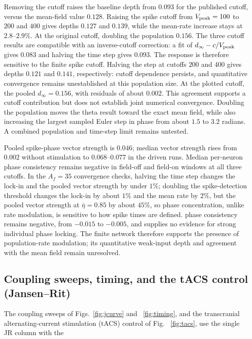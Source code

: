 \documentclass[11pt,a4paper]{article}
\providecommand{\DIFaddtex}[1]{{\protect\color{blue} \sf #1}} %
\providecommand{\DIFdeltex}[1]{{\protect\color{red} \scriptsize #1}} %
\providecommand{\DIFaddbegin}{} %
\providecommand{\DIFaddend}{} %
\providecommand{\DIFdelbegin}{} %
\providecommand{\DIFdelend}{} %
\providecommand{\DIFadd}[1]{\texorpdfstring{\DIFaddtex{#1}}{#1}} %
\providecommand{\DIFdel}[1]{\texorpdfstring{\DIFdeltex{#1}}{}} %
\begin{document}
\DIFadd{Removing the cutoff raises the baseline depth from }\DIFaddend $0.093$ \DIFdelbegin \DIFdel{for the published cutoff,
versus the mean-field value $0.128$. Raising the spike cutoff from $V_{\rm peak}=100$ }\DIFdelend to \DIFdelbegin \DIFdel{$200$ and $400$ gives depths $0.127$ and $0.139$, while the mean-rate increase
stays at $2.8$--$2.9\%$.
At the original cutoff, doubling the population}\DIFdelend \DIFaddbegin \DIFadd{$0.156$.
The three cutoff results are compatible with an inverse-cutoff correction:
a fit of $d_\infty-c/V_{\rm peak}$ }\DIFaddend gives \DIFdelbegin \DIFdel{$0.083$ and halving the time step gives $0.093$. The response is therefore
sensitive to the finite spike cutoff. Halving the step at cutoffs $200$ and
$400$ gives depths $0.121$ and $0.141$, respectively: cutoff dependence persists,
and quantitative convergence remains unestablished at this population size.
At the plotted cutoff, the pooled }\DIFdelend \DIFaddbegin \DIFadd{$d_\infty=0.156$, with residuals
of about $0.002$. This agreement supports a cutoff contribution but does not
establish joint numerical convergence. Doubling the population moves the
theta result toward the exact mean field, while also increasing the largest
sampled Euler step in phase from about $1.5$ to $3.2$ radians. A combined
population and time-step limit remains untested.
}

\DIFadd{Pooled }\DIFaddend spike-phase \DIFdelbegin \DIFdel{vector strength is $0.046$;
median }\DIFdelend \DIFaddbegin \DIFadd{vector strength rises from $0.002$ without stimulation
to $0.068$--$0.077$ in the driven runs. Median }\DIFaddend per-neuron \DIFdelbegin \DIFdel{phase consistency remains negative in field-off and field-on
windows at all three cutoffs.
In the $A_f=35$ convergence checks, halving the time step changes the lock-in and the pooled vector
strength by under $1\%$; doubling the spike-detection threshold changes the lock-in by about $1\%$ and the mean rate by $2\%$, but the pooled vector strength at
$\bar\eta=0.85$ by about $45\%$, so phase concentration, unlike rate modulation, is sensitive to
how spike times are defined.
}\DIFdelend \DIFaddbegin \DIFadd{phase consistency
remains negative, from $-0.015$ to $-0.005$, and supplies no evidence for
strong individual phase locking. The finite network therefore supports the
presence of population-rate modulation; its quantitative weak-input depth
and agreement with the mean field remain unresolved.
}\DIFaddend

\DIFdelbegin \subsection{\DIFdel{Coupling sweeps, timing, and the tACS control (Jansen--Rit)}}
\addtocounter{subsection}{-1}%
\DIFdel{The coupling sweeps of Figs.~\ref{fig:jcurve} and ~\ref{fig:timing}, and the transcranial
alternating-current stimulation (tACS) control of Fig. ~\ref{fig:tacs}, use the single JR
column with the }\DIFdelend \DIFaddbegin \fi
\end{document}
